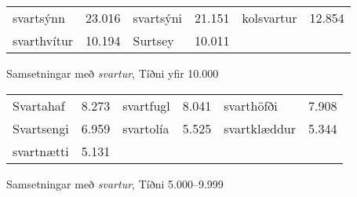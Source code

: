 \documentclass[../samsetningasafn.tex]{subfiles}
\begin{document}
\begin{wordlist}[ht!]
\begin{tcolorbox}

	\setlength{\extrarowheight}{3pt} 
	\begin{tabular}{BlBlBl}
		svartsýnn	& 23.016 	& 
		svartsýni 	& 21.151 	& 
		kolsvartur 	& 12.854 	\\ 
		svarthvítur 	& 10.194 	& 
		Surtsey 	& 10.011 	& 
				&		
	\end{tabular}

\end{tcolorbox}
	\caption{Samsetningar með \textit{svartur}, Tíðni yfir 10.000}
	\label{listi:svart.10000}
\end{wordlist}

\begin{wordlist}[ht!]
\begin{tcolorbox}

	\setlength{\extrarowheight}{3pt}
	\begin{tabular}{BlBlBl}
		Svartahaf	& 8.273	& 
		svartfugl	& 8.041	& 
		svarthöfði	& 7.908	\\ 
		Svartsengi 	& 6.959	& 
		svartolía	& 5.525	& 
		svartklæddur & 5.344	\\ 
		svartnætti	& 5.131	& 
				&		&
				&		
	\end{tabular}

\end{tcolorbox}
	\caption{Samsetningar með \textit{svartur}, Tíðni 5.000--9.999}
	\label{listi:svart.5000}
\end{wordlist}
\end{document}
